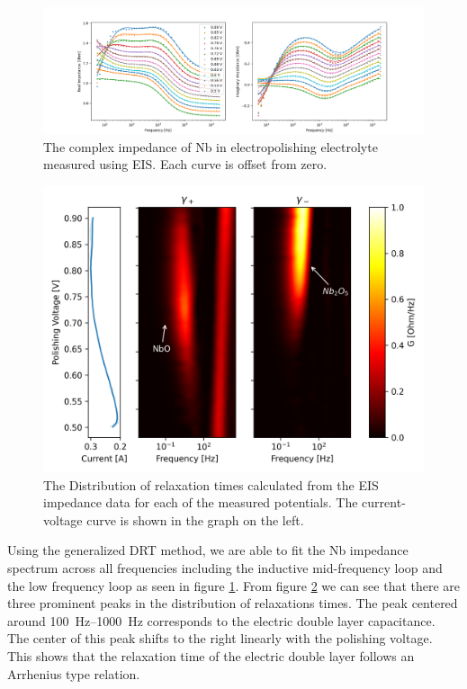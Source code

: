 \begin{figure}[t]
  
  \includegraphics[width=\textwidth]{../figures/bodeplot.png}
  \caption{The complex impedance of Nb in electropolishing electrolyte measured using EIS. Each curve is offset from zero.}
  \label{fig:bodeplot}
\end{figure}

\begin{figure}[t]
  
  \includegraphics[width=\textwidth]{../figures/gamma.png}  
  \caption{The Distribution of relaxation times calculated from the EIS impedance data for each of the measured potentials. The current-voltage curve is shown in the graph on the left.}
  \label{fig:gamma}
\end{figure}

Using the generalized DRT method, we are able to fit the Nb impedance spectrum across all frequencies including the inductive mid-frequency loop and the low frequency loop as seen in figure \ref{fig:bodeplot}. From figure \ref{fig:gamma} we can see that there are three prominent peaks in the distribution of relaxations times. The peak centered around \qtyrange{100}{1000}{\hertz} corresponds to the electric double layer capacitance. The center of this peak shifts to the right linearly with the polishing voltage. This shows that the relaxation time of the electric double layer follows an Arrhenius type relation.

